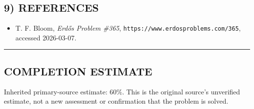 \subsection*{9) REFERENCES}
\begin{itemize}
\item[Bloom365] T. F. Bloom, \emph{Erd\H{o}s Problem \#365}, \texttt{https://www.erdosproblems.com/365}, accessed 2026-03-07.
\end{itemize}

\bigskip\hrule\bigskip



\subsection*{COMPLETION ESTIMATE}
Inherited primary-source estimate: $60\%$. This is the original source's unverified estimate, not a new assessment or confirmation that the problem is solved.
